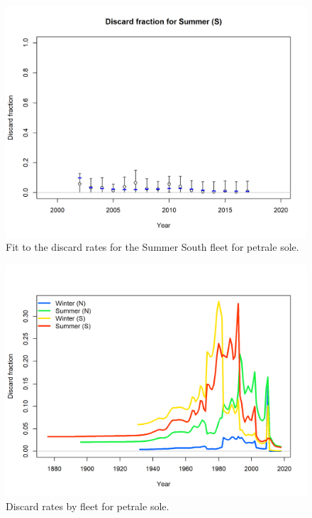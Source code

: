 \documentclass[12pt,]{article}
\begin{document}
\FloatBarrier

\begin{figure}
\centering
\includegraphics{r4ss/plots_mod1/discard_fitSummer (S).png}
\caption{Fit to the discard rates for the Summer South fleet for petrale
sole. \label{fig:fit_ss_discard}}
\end{figure}

\FloatBarrier

\begin{figure}
\centering
\includegraphics{r4ss/plots_mod1/catch8 discard fraction.png}
\caption{Discard rates by fleet for petrale sole. \label{fig:Discard}}
\end{figure}
\end{document}
